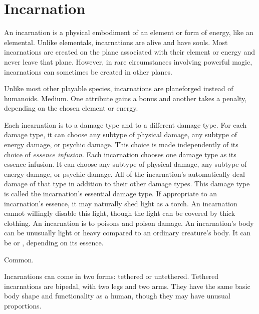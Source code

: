 \section{Incarnation}

  An incarnation is a physical embodiment of an element or form of energy, like an elemental.
  Unlike elementals, incarnations are alive and have souls.
  Most incarnations are created on the plane associated with their element or energy and never leave that plane.
  However, in rare circumstances involving powerful magic, incarnations can sometimes be created in other planes.

   Unlike most other playable species, incarnations are planeforged instead of humanoids.
   Medium.
   One attribute gains a  bonus and another takes a  penalty, depending on the chosen element or energy.
  \begin{itemize}
     Each incarnation is \impervious to a damage type and \vulnerable to a different damage type.
      For each damage type, it can choose any subtype of physical damage, any subtype of energy damage, or psychic damage.
      This choice is made independently of its choice of \textit{essence infusion}.
       Each incarnation chooses one damage type as its essence infusion.
      It can choose any subtype of physical damage, any subtype of energy damage, or psychic damage.
      All of the incarnation's  automatically deal damage of that type in addition to their other damage types.
      This damage type is called the incarnation's essential damage type.
     If appropriate to an incarnation's essence, it may naturally shed light as a torch.
      An incarnation cannot willingly disable this light, though the light can be covered by thick clothing.
     An incarnation is \impervious to poisons and poison damage.
     An incarnation's body can be unusually light or heavy compared to an ordinary creature's body.
      It can be  or , depending on its essence.
  \end{itemize}
   Common.

  Incarnations can come in two forms: tethered or untethered.
  Tethered incarnations are bipedal, with two legs and two arms.
  They have the same basic body shape and functionality as a human, though they may have unusual proportions.

